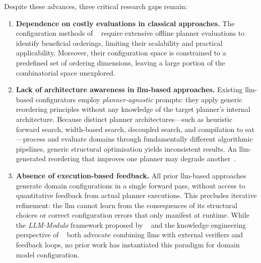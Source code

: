Despite these advances, three critical research gaps remain:

\begin{enumerate}
  \item \textbf{Dependence on costly evaluations in classical approaches.}
        The configuration methods of \citeauthor{Vallati2015}~\cite{Vallati2015, Vallati2021} require extensive offline planner evaluations to identify beneficial orderings, limiting their scalability and practical applicability.
        Moreover, their configuration space is constrained to a predefined set of ordering dimensions, leaving a large portion of the combinatorial space unexplored.

  \item \textbf{Lack of architecture awareness in \gls{llm}-based approaches.}
        Existing \gls{llm}-based configurators employ \emph{planner-agnostic} prompts: they apply generic reordering principles without any knowledge of the target planner's internal architecture.
        Because distinct planner architectures---such as heuristic forward search, width-based search, decoupled search, and compilation to \gls{sat}---process and evaluate domains through fundamentally different algorithmic pipelines, generic structural optimisation yields inconsistent results.
        An \gls{llm}-generated reordering that improves one planner may degrade another~\cite{Georgievski2025}.

  \item \textbf{Absence of execution-based feedback.}
        All prior \gls{llm}-based approaches generate domain configurations in a single forward pass, without access to quantitative feedback from actual planner executions.
        This precludes iterative refinement: the \gls{llm} cannot learn from the consequences of its structural choices or correct configuration errors that only manifest at runtime.
        While the \emph{LLM-Modulo} framework proposed by \citeauthor{Kambhampati2024}~\cite{Kambhampati2024} and the knowledge engineering perspective of \citeauthor{Vallati2025}~\cite{Vallati2025} both advocate combining \glspl{llm} with external verifiers and feedback loops, no prior work has instantiated this paradigm for domain model configuration.
\end{enumerate}

